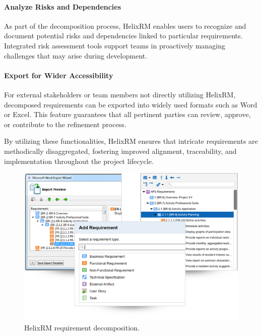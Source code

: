 \paragraph{Analyze Risks and Dependencies}
As part of the decomposition process, HelixRM enables users to recognize and document potential risks and dependencies linked to particular requirements.
Integrated risk assessment tools support teams in proactively managing challenges that may arise during development.

\paragraph{Export for Wider Accessibility}
For external stakeholders or team members not directly utilizing HelixRM, decomposed requirements can be exported into widely used formats such as Word or Excel.
This feature guarantees that all pertinent parties can review, approve, or contribute to the refinement process.

By utilizing these functionalities, HelixRM ensures that intricate requirements are methodically disaggregated, fostering improved alignment, traceability, and implementation throughout the project lifecycle.


\begin{figure}[htbp]
    \centerline{
        \includegraphics[width=\linewidth]
        {images/decompose}
    }
    \caption{HelixRM requirement decomposition.}
    \label{fig:fig}
\end{figure}